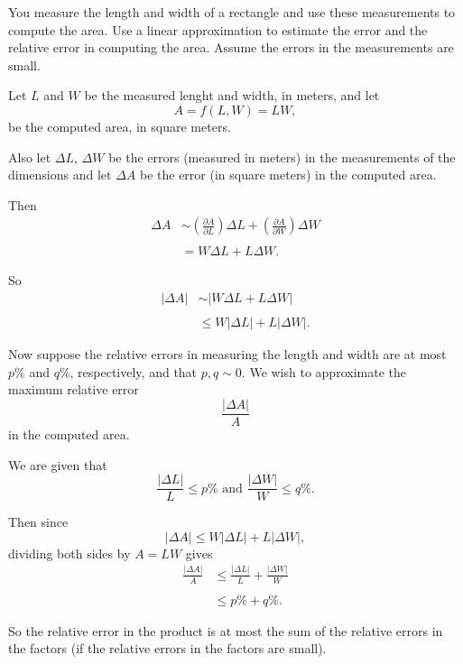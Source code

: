 \documentclass{ximera}
\begin{document}
\begin{example}  \label{Edstrt4th}
You measure the length and width of a rectangle and use these measurements to compute the area. Use a linear approximation to estimate the error and the relative error in computing the area. Assume the errors in the measurements are small.

\begin{explanation}
Let $L$ and $W$ be the measured lenght and width, in meters, and let
\[
  A =f(L,W) = LW ,
\]
be the computed area, in square meters. 

Also let $\Delta L$, $\Delta W$ be the errors (measured in meters) in the measurements of the dimensions and let $\Delta A$ be the error (in square meters) in the computed area.

Then
\begin{align*}
   \Delta A  &\sim  \left( \frac{\partial A}{\partial L} \right) \Delta L + \left( \frac{\partial A}{\partial W} \right)  \Delta W \\ \\
                &=  W\Delta L +  L \Delta W .
\end{align*}

So
\begin{align*}
    | \Delta A |  &\sim |   W\Delta L +  L \Delta W | \\ \\
                      & \leq W|\Delta L| + L |\Delta W| .
\end{align*}

Now suppose the relative errors in measuring the length and width are at most $p\%$ and $q\%$, respectively, and that $p,q \sim 0$.  We wish to approximate the maximum relative error
\[
      \frac{|\Delta A|}{A}
\]
in the computed area.

We are given that 
\[
      \frac{|\Delta L|}{L} \leq p\% \text{ and } \frac{|\Delta W|}{W} \leq q\% .
\]

Then since
\[
  | \Delta A | \leq W|\Delta L| + L |\Delta W| ,
\]
dividing both sides by $A = LW$ gives
\begin{align*}
      \frac{|\Delta A|}{A} & \leq \frac{|\Delta L|}{L} + \frac{|\Delta W|}{W} \\ \\
                                   & \leq p\% + q\% .
\end{align*}

So the relative error in the product is at most the sum of the relative errors in the factors (if the relative errors in the factors are small).

\end{explanation}

\end{example}
\end{document}
